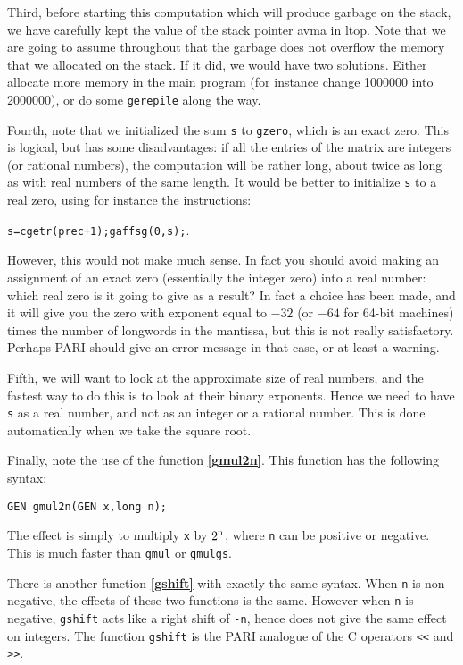 Third, before starting this computation which will produce garbage on the stack,
we have carefully kept the value of the stack pointer avma in ltop. Note that
we are going to assume throughout that the garbage does not overflow the
memory that we allocated on the stack. If it did, we would have two solutions.
Either allocate more memory in the main program (for instance change 1000000
into 2000000), or do some {\tt gerepile} along the way.

Fourth, note that we initialized the sum {\tt s} to {\tt gzero}, which is an exact
zero. This is logical, but has some disadvantages: if all the entries of the
matrix are integers (or rational numbers), the computation will be rather
long, about twice as long as with real numbers of the same length. 
It would be better to initialize {\tt s} to a real zero, using for instance
the instructions:

{\tt s=cgetr(prec+1);gaffsg(0,s);}. 

However, this would not make much sense. In fact you should avoid making
an assignment of an exact zero (essentially the integer zero) into a real
number: which real zero is it going to give as a result? In fact a choice
has been made, and it will give you the zero with exponent equal to $-32$
(or $-64$ for 64-bit machines)
times the number of longwords in the mantissa, but this is not really
satisfactory. Perhaps PARI should give an error message in that case, or
at least a warning.

Fifth, we will want to look at the approximate size of real numbers, and
the fastest way to do this is to look at their binary exponents. Hence we
need to have {\tt s} as a real number, and not as an integer or a rational
number. This is done automatically when we take the square root.

Finally, note the use of the function {\bf \ref{gmul2n}}. This function has the
following syntax:

{\tt GEN gmul2n(GEN x,long n);}

The effect is simply to multiply {\tt x} by $2^{\text n}$, where {\tt n} can
be positive or negative. This is much faster than {\tt gmul} or {\tt gmulgs}.

There is another function {\bf \ref{gshift}} with exactly the same syntax.
When {\tt n} is non-negative, the effects of these two functions is the same.
However when {\tt n} is negative, {\tt gshift} acts like a right shift of {\tt -n},
hence does not give the same effect on integers. The function {\tt gshift} is
the PARI analogue of the C operators {\tt <<} and {\tt >>}.

